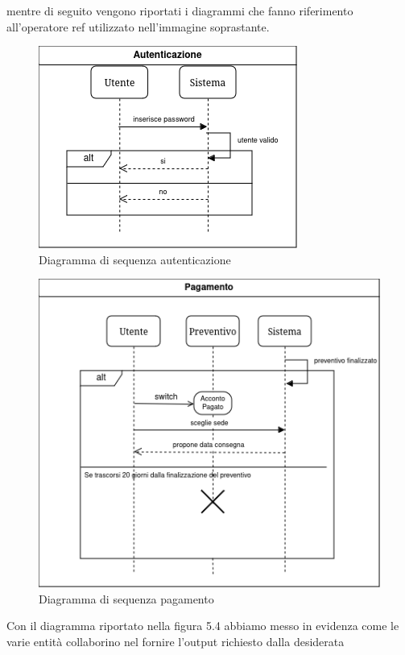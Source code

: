 \documentclass[a4paper, 11pt,oneside]{book}
\newcommand{\spacing}{\par\bigskip\noindent}
\begin{document}
        mentre di seguito vengono riportati i diagrammi che fanno riferimento all'operatore ref utilizzato nell'immagine soprastante.
        \begin{figure}[H]
            \centering
            \includegraphics[scale=0.75]{sequence_diagram_rif_autenticazione.png}
            \caption{Diagramma di sequenza autenticazione}
            \label{fig:diagramma_sequenza_autenticazione}
        \end{figure}
        \begin{figure}[H]
            \centering
            \includegraphics[scale=0.75]{sequence_diagram_rif_pagamento.png}
            \caption{Diagramma di sequenza pagamento}
            \label{fig:diagramma_sequenza_pagamento}
        \end{figure}
        \spacing
        \newpage\noindent
        Con il diagramma riportato nella figura 5.4 abbiamo messo in evidenza come le varie entità collaborino nel fornire l'output richiesto dalla desiderata
\end{document}
